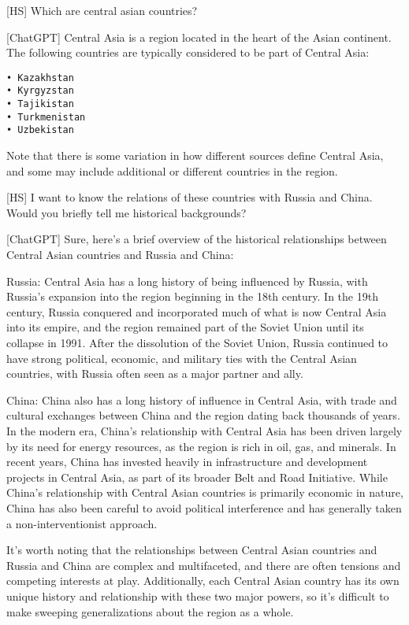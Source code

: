 \documentclass[
]{bxjsbook}
\theoremstyle{definition}
\theoremstyle{definition}
\theoremstyle{definition}
\theoremstyle{definition}
\theoremstyle{remark}
\begin{document}
{[}HS{]} Which are central asian countries?

{[}ChatGPT{]} Central Asia is a region located in the heart of the Asian continent. The following countries are typically considered to be part of Central Asia:

\begin{verbatim}
• Kazakhstan
• Kyrgyzstan
• Tajikistan
• Turkmenistan
• Uzbekistan
\end{verbatim}

Note that there is some variation in how different sources define Central Asia, and some may include additional or different countries in the region.

{[}HS{]} I want to know the relations of these countries with Russia and China. Would you briefly tell me historical backgrounds?

{[}ChatGPT{]} Sure, here's a brief overview of the historical relationships between Central Asian countries and Russia and China:

Russia:
Central Asia has a long history of being influenced by Russia, with Russia's expansion into the region beginning in the 18th century. In the 19th century, Russia conquered and incorporated much of what is now Central Asia into its empire, and the region remained part of the Soviet Union until its collapse in 1991. After the dissolution of the Soviet Union, Russia continued to have strong political, economic, and military ties with the Central Asian countries, with Russia often seen as a major partner and ally.

China:
China also has a long history of influence in Central Asia, with trade and cultural exchanges between China and the region dating back thousands of years. In the modern era, China's relationship with Central Asia has been driven largely by its need for energy resources, as the region is rich in oil, gas, and minerals. In recent years, China has invested heavily in infrastructure and development projects in Central Asia, as part of its broader Belt and Road Initiative. While China's relationship with Central Asian countries is primarily economic in nature, China has also been careful to avoid political interference and has generally taken a non-interventionist approach.

It's worth noting that the relationships between Central Asian countries and Russia and China are complex and multifaceted, and there are often tensions and competing interests at play. Additionally, each Central Asian country has its own unique history and relationship with these two major powers, so it's difficult to make sweeping generalizations about the region as a whole.
\end{document}
